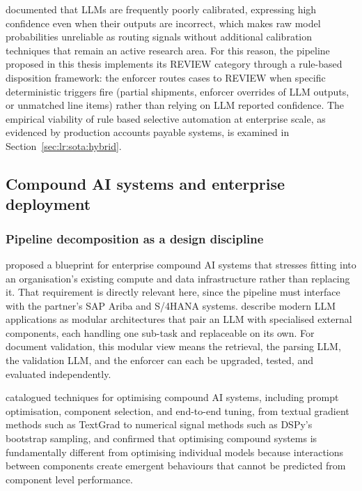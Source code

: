  \citet{mao2025} documented that LLMs are frequently poorly calibrated, expressing high confidence even when their outputs are incorrect, which makes raw model probabilities unreliable as routing signals without additional calibration techniques that remain an active research area. For this reason, the pipeline proposed in this thesis implements its REVIEW category through a rule-based disposition framework: the enforcer routes cases to REVIEW when specific deterministic triggers fire (partial shipments, enforcer overrides of LLM outputs, or unmatched line items) rather than relying on LLM reported confidence. The empirical viability of rule based selective automation at enterprise scale, as evidenced by production accounts payable systems, is examined in Section~\ref{sec:lr:sota:hybrid}.


\subsection{Compound AI systems and enterprise deployment}
\label{sec:lr:compound}

\subsubsection{Pipeline decomposition as a design discipline}

\citet{zaharia2025} proposed a blueprint for enterprise compound AI systems that stresses fitting into an organisation's existing compute and data infrastructure rather than replacing it. That requirement is directly relevant here, since the pipeline must interface with the partner's SAP Ariba and S/4HANA systems. \citet{chen2025compound} describe modern LLM applications as modular architectures that pair an LLM with specialised external components, each handling one sub-task and replaceable on its own. For document validation, this modular view means the retrieval, the parsing LLM, the validation LLM, and the enforcer can each be upgraded, tested, and evaluated independently.

\citet{lee2025} catalogued techniques for optimising compound AI systems, including prompt optimisation, component selection, and end-to-end tuning, from textual gradient methods such as TextGrad to numerical signal methods such as DSPy's bootstrap sampling, and confirmed that optimising compound systems is fundamentally different from optimising individual models because interactions between components create emergent behaviours that cannot be predicted from component level performance.

